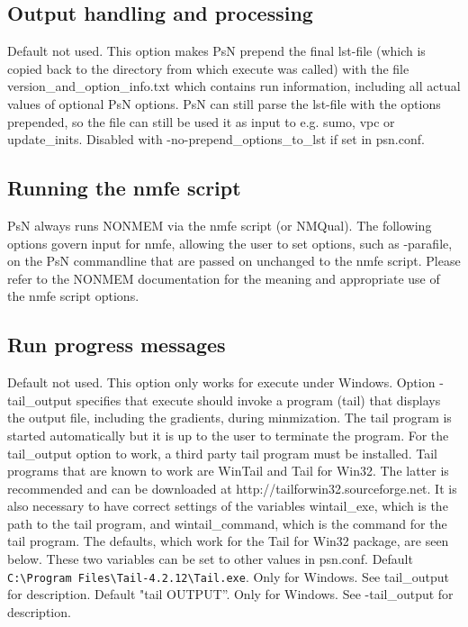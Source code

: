\subsection{Output handling and processing}

\begin{optionlist}
Default not used. This option makes PsN prepend the final lst-file (which is copied back to the directory from which execute was called) with the file version\_and\_option\_info.txt which contains run information, including     all actual values of optional PsN options. PsN can still parse the lst-file with the options prepended, so the file can still be used it as input to e.g. sumo, vpc or update\_inits. Disabled with -no-prepend\_options\_to\_lst if set in psn.conf.
\nextopt
\end{optionlist}

\subsection{Running the nmfe script}
PsN always runs NONMEM via the nmfe script (or NMQual). 
The following options govern input for
nmfe, allowing the user to set options, such as \mbox{-parafile}, on the PsN commandline that
are passed on unchanged to the nmfe script.
Please refer to the NONMEM documentation for the meaning and appropriate use
of the nmfe script options.


\subsection{Run progress messages}

\begin{optionlist}
Default not used. This option only works for execute under Windows. Option -tail\_output specifies that execute should invoke a program (tail) that displays the output file, including the gradients, during minmization. The tail program is started automatically but it is up to the user to terminate the program. For the tail\_output option to work, a third party tail program must be installed. Tail programs that are known to work are WinTail and Tail for Win32.  The latter is recommended and can be downloaded at http://tailforwin32.sourceforge.net. It is also necessary to have correct settings of the variables wintail\_exe, which is the path to the tail program, and wintail\_command, which is the command for the tail program. The defaults, which work for the Tail for Win32 package, are seen below. These two variables can be set to other values in psn.conf.
\nextopt
{}
Default \verb|C:\Program Files\Tail-4.2.12\Tail.exe|. Only for Windows. See tail\_output for description.
\nextopt
{}
Default "tail OUTPUT”. Only for Windows. See -tail\_output for description.
\nextopt
\end{optionlist}


